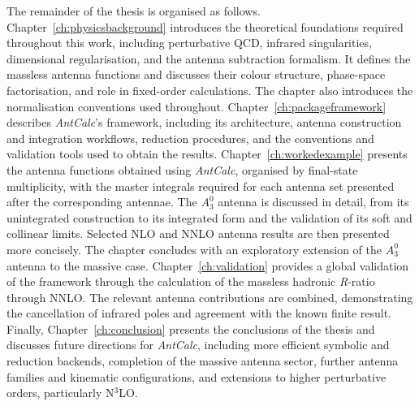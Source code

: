 The remainder of the thesis is organised as follows. Chapter~\ref{ch:physicsbackground}
introduces the theoretical foundations required throughout this work, including
perturbative QCD, infrared singularities, dimensional regularisation, and the antenna
subtraction formalism. It defines the massless antenna functions and discusses their
colour structure, phase-space factorisation, and role in fixed-order calculations. The
chapter also introduces the normalisation conventions used throughout. 
Chapter~\ref{ch:packageframework} describes \textit{AntCalc}'s framework, including its
architecture, antenna construction and integration workflows, reduction procedures, and
the conventions and validation tools used to obtain the results.
Chapter~\ref{ch:workedexample} presents the antenna functions obtained using
\textit{AntCalc}, organised by final-state multiplicity, with the master integrals
required for each antenna set presented after the corresponding antennae.
The $A_3^0$ antenna is discussed in detail, from its unintegrated construction to its
integrated form and the validation of its soft and collinear limits. Selected NLO and
NNLO antenna results are then presented more concisely. The chapter concludes with an
exploratory extension of the $A_3^0$ antenna to the massive case.
Chapter~\ref{ch:validation} provides a global validation of the framework through the
calculation of the massless hadronic \textit{R}-ratio through NNLO. The relevant antenna
contributions are combined, demonstrating the cancellation of infrared poles and
agreement with the known finite result.
Finally, Chapter~\ref{ch:conclusion} presents the conclusions of the thesis and discusses
future directions for \textit{AntCalc}, including more efficient symbolic and reduction
backends, completion of the massive antenna sector, further antenna families and kinematic
configurations, and extensions to higher perturbative orders, particularly N$^3$LO.